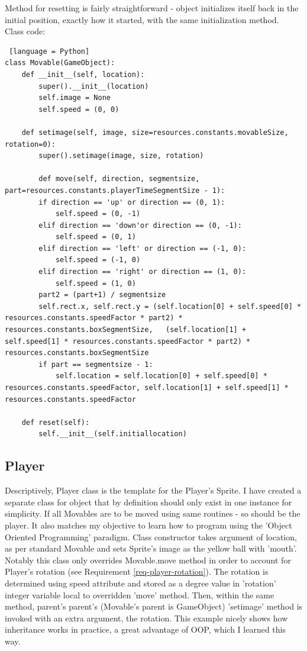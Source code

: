 \documentclass[11pt,a4paper,notitlepage]{report}
\newcommand{\dsubsection}[1]{\FloatBarrier \subsection{#1}}
\begin{document}
				Method for resetting is fairly straightforward - object initializes itself back in the initial position, exactly how it started, with the same initialization method.\\
				Class code:
				\begin{lstlisting} [language = Python]
class Movable(GameObject):
	def __init__(self, location):
		super().__init__(location)
		self.image = None
		self.speed = (0, 0)
		
	def setimage(self, image, size=resources.constants.movableSize, rotation=0):
		super().setimage(image, size, rotation)
	
		def move(self, direction, segmentsize, part=resources.constants.playerTimeSegmentSize - 1):
		if direction == 'up' or direction == (0, 1):
			self.speed = (0, -1)
		elif direction == 'down'or direction == (0, -1):
			self.speed = (0, 1)
		elif direction == 'left' or direction == (-1, 0):
			self.speed = (-1, 0)
		elif direction == 'right' or direction == (1, 0):
			self.speed = (1, 0)
		part2 = (part+1) / segmentsize
		self.rect.x, self.rect.y = (self.location[0] + self.speed[0] * resources.constants.speedFactor * part2) * resources.constants.boxSegmentSize,	(self.location[1] + self.speed[1] * resources.constants.speedFactor * part2) * resources.constants.boxSegmentSize
		if part == segmentsize - 1:
			self.location = self.location[0] + self.speed[0] * resources.constants.speedFactor, self.location[1] + self.speed[1] * resources.constants.speedFactor
	
	def reset(self):
		self.__init__(self.initiallocation)
				\end{lstlisting}
			\dsubsection{Player}
				Descriptively, Player class is the template for the Player's Sprite. I have created a separate class for object that by definition should only exist in one instance for simplicity. If all Movables are to be moved using same routines - so should be the player. It also matches my objective to learn how to program using the 'Object Oriented Programming' paradigm. 
				Class constructor takes argument of location, as per standard Movable and sets Sprite's image as the yellow ball with 'mouth'.
				Notably this class only overrides Movable.move method in order to account for Player's rotation (see Requirement \ref{req-player-rotation}). The rotation is determined using speed attribute and stored as a degree value in 'rotation' integer variable local to overridden 'move' method. Then, within the same method, parent's parent's (Movable's parent is GameObject) 'setimage' method is invoked with an extra argument, the rotation. This example nicely shows how inheritance works in practice, a great advantage of OOP, which I learned this way.\\
\end{document}
